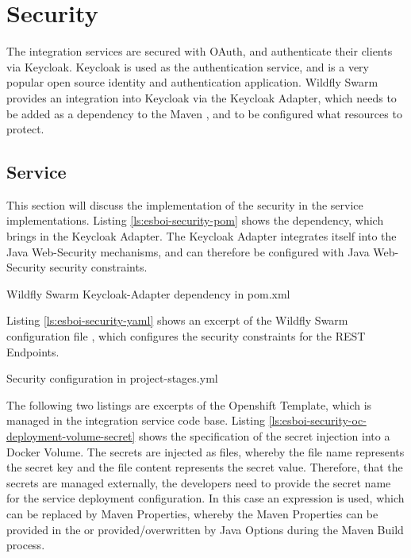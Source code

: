 \section{Security}
\label{sec:esbi-security}
The integration services are secured with OAuth, and authenticate their clients via Keycloak. Keycloak is used as the authentication service, and is a very popular open source identity and authentication application. Wildfly Swarm provides an integration into Keycloak via the Keycloak Adapter, which needs to be added as a dependency to the Maven , and to be configured what resources to protect.

\subsection{Service}
\label{sec:esbi-security-service}
This section will discuss the implementation of the security in the service implementations. Listing \vref{ls:esboi-security-pom} shows the dependency, which brings in the Keycloak Adapter. The Keycloak Adapter integrates itself into the Java Web-Security mechanisms, and can therefore be configured with Java Web-Security security constraints.

\begin{listing}[h]
	\caption{Wildfly Swarm Keycloak-Adapter dependency in pom.xml}
	\label{ls:esboi-security-pom}
\end{listing}

Listing \vref{ls:esboi-security-yaml} shows an excerpt of the Wildfly Swarm configuration file , which configures the security constraints for the REST Endpoints.

\begin{listing}[h]
	\caption{Security configuration in project-stages.yml}
	\label{ls:esboi-security-yaml}
\end{listing}

The following two listings are excerpts of the  Openshift Template, which is managed in the integration service code base. Listing \vref{ls:esboi-security-oc-deployment-volume-secret} shows the specification of the secret injection into a Docker Volume. The secrets are injected as files, whereby the file name represents the secret key and the file content represents the secret value. Therefore, that the secrets are managed externally, the developers need to provide the secret name for the service deployment configuration. In this case an expression is used, which can be replaced by Maven Properties, whereby the Maven Properties can be provided in the  or provided/overwritten by Java Options during the Maven Build process.

